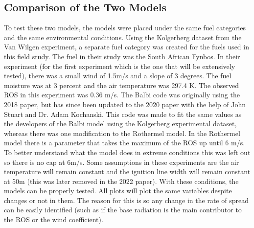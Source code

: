 \documentclass{article}
\begin{document}
\subsection{Comparison of the Two Models}
\indent To test these two models, the models were placed under the same fuel categories and the same environmental conditions. Using the Kolgerberg dataset from the Van Wilgen experiment, a separate fuel category was created for the fuels used in this field study. The fuel in their study was the South African Fynbos. In their experiment (for the first experiment which is the one that will be extensively tested), there was a small wind of 1.5m/s and a slope of 3 degrees. The fuel moisture was at 3 percent and the air temperature was 297.4 K. The observed ROS in this experiment was 0.36 m/s. The Balbi code was originally using the 2018 paper, but has since been updated to the 2020 paper with the help of John Stuart and Dr. Adam Kochanski. This code was made to fit the same values as the developers of the Balbi model using the Kolgerberg experimental dataset, whereas there was one modification to the Rothermel model. In the Rothermel model there is a parameter that takes the maximum of the ROS up until 6 m/s. To better understand what the model does in extreme conditions this was left out so there is no cap at 6m/s. Some assumptions in these experiments are the air temperature will remain constant and the ignition line width will remain constant at 50m (this was later removed in the 2022 paper). With these conditions, the models can be properly tested. All plots will plot the same variables despite changes or not in them. The reason for this is so any change in the rate of spread can be easily identified (such as if the base radiation is the main contributor to the ROS or the wind coefficient). 
\end{document}
